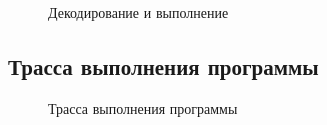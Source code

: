 \begin{figure}[ph!]
    \caption{Декодирование и выполнение}
\end{figure}

\clearpage
\subsection{Трасса выполнения программы}


\begin{figure}[h]
    \centering
    
    \caption{Трасса выполнения программы}
    \label{fig:my_figure}
\end{figure}

